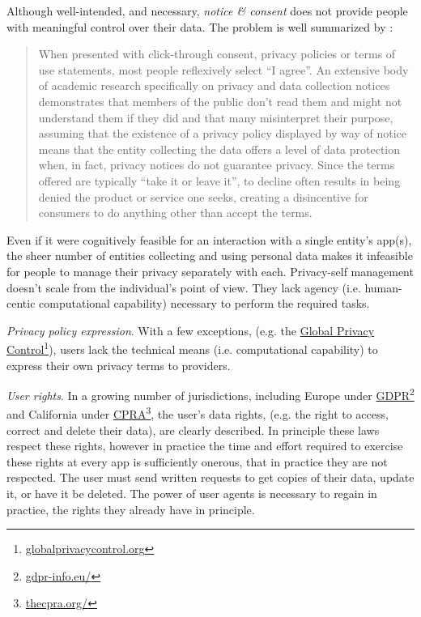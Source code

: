 \documentclass[11pt, oneside]{article}   	%
\newcommand{\hyperfootnote}[1][]{\def\ArgI{{#1}}\hyperfootnoteRelay}
\newcommand\hyperfootnoteRelay[2][]{\href{#1#2}{\ArgI}\footnote{\href{#1#2}{#2}}}
\begin{document}
Although well-intended, and necessary, \emph{notice \& consent} does not provide people with meaningful control over their data. The problem is well summarized by \cite{Flanagan2020}: 

\begin{quote}
	When presented with click-through consent, privacy policies or terms of use statements, most people reflexively select “I agree”. An extensive body of academic research specifically on privacy and data collection notices demonstrates that members of the public don't read them and might not understand them if they did and that many misinterpret their purpose, assuming that the existence of a privacy policy displayed by way of notice means that the entity collecting the data offers a level of data protection when, in fact, privacy notices do not guarantee privacy. Since the terms offered are typically “take it or leave it”, to decline often results in being denied the product or service one seeks, creating a disincentive for consumers to do anything other than accept the terms.
\end{quote}

Even if it were cognitively feasible for an interaction with a single entity's app(s), the sheer number of entities collecting and using personal data makes it infeasible for people to manage their privacy separately with each. Privacy-self management doesn't scale from the individual's point of view. They lack agency (i.e. human-centic computational capability) necessary to perform the required tasks.

\emph{Privacy policy expression}. With a few exceptions, (e.g. the \hyperfootnote[Global Privacy Control][https://]{globalprivacycontrol.org}), users  lack the technical means (i.e. computational capability) to express their own privacy terms to providers. 

\emph{User rights}. In a growing number of jurisdictions, including Europe under \hyperfootnote[GDPR][https://]{gdpr-info.eu/} and California under \hyperfootnote[CPRA][https://]{thecpra.org/}, the user's data rights, (e.g. the right to access, correct and delete their data), are clearly described. In principle these laws respect these rights, however in practice the time and effort required to exercise these rights at every app is sufficiently onerous, that in practice they are not respected. The user must send written requests to get copies of their data, update it, or have it be deleted. The power of user agents is necessary to regain in practice, the rights they already have in principle. 
\end{document}
